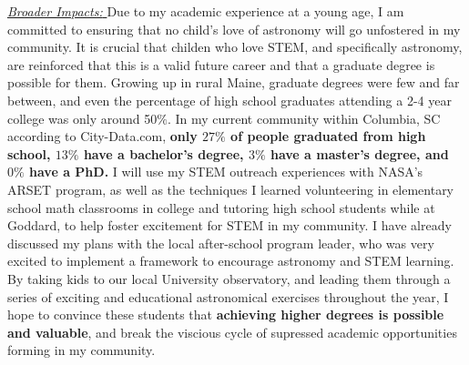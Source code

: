 \underline{\textit{Broader Impacts: }}
Due to my academic experience at a young age, I am committed to ensuring that no
child's love of astronomy will go unfostered in my community. It is crucial that childen who love STEM, and
specifically astronomy, are reinforced that this is a valid
future career and that a graduate degree is possible for them. Growing
up in rural Maine, graduate degrees were few and far between, and even
the percentage of high school graduates attending a 2-4 year college
was only around 50$\%$. In my current community within Columbia, SC
according to City-Data.com, \textbf{only $27\%$ of people graduated from high
school, $13\%$ have a bachelor's degree, $3\%$ have a master's degree,
and $0\%$ have a PhD.} I will use my STEM outreach experiences with NASA's ARSET program, as well as the techniques I learned volunteering in elementary school math classrooms in college and tutoring high school students while at Goddard, to help foster excitement for STEM in my community. I have already discussed my plans with the local after-school program leader, who was very excited to implement a framework to encourage astronomy and STEM learning. By taking kids to our local University observatory, and leading them through a series of exciting and educational astronomical exercises throughout the year, I hope to convince these students that \textbf{achieving higher degrees is possible and valuable}, and break the viscious cycle of supressed academic opportunities forming in my community. 

